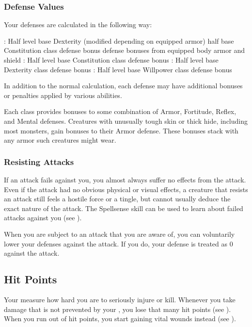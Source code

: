         \subsubsection{Defense Values}\label{Defense Values}

            Your defenses are calculated in the following way:
            \begin{itemize}
                : Half level \add base Dexterity (modified depending on equipped armor) \add half base Constitution \add class defense bonus \add defense bonuses from equipped body armor and shield
                : Half level \add base Constitution \add class defense bonus
                : Half level \add base Dexterity \add class defense bonus
                : Half level \add base Willpower \add class defense bonus
            \end{itemize}
            In addition to the normal calculation, each defense may have additional bonuses or penalties applied by various abilities.

             Each class provides bonuses to some combination of Armor, Fortitude, Reflex, and Mental defenses.
             Creatures with unusually tough skin or thick hide, including most monsters, gain bonuses to their Armor defense.
            These bonuses stack with any armor such creatures might wear.

        \subsubsection{Resisting Attacks}
            If an attack fails against you, you almost always suffer no effects from the attack.
            Even if the attack had no obvious physical or visual effects, a creature that resists an attack still feels a hostile force or a tingle, but cannot usually deduce the exact nature of the attack.
            The Spellsense skill can be used to learn about failed  attacks against you (see ).

             When you are subject to an attack that you are aware of, you can voluntarily lower your defenses against the attack.
            If you do, your defense is treated as 0 against the attack.

    \subsection{Hit Points}\label{Hit Points}
        Your  measure how hard you are to seriously injure or kill.
        Whenever you take damage that is not prevented by your , you lose that many hit points (see ).
        When you run out of hit points, you start gaining vital wounds instead (see ).

